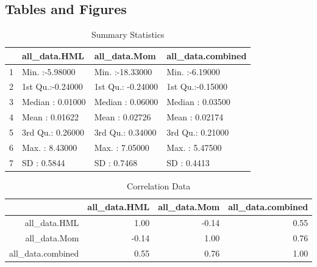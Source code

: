 \documentclass[12pt,letterpaper]{memoir}
\begin{document}
\subsection*{Tables and Figures}
\begin{table}[ht]
\centering
\caption{Summary Statistics}
\begin{tabular}{rlll}
  \hline
 &  all\_data.HML &  all\_data.Mom & all\_data.combined \\ 
  \hline
1 & Min.   :-5.98000   & Min.   :-18.33000   & Min.   :-6.19000   \\ 
  2 & 1st Qu.:-0.24000   & 1st Qu.: -0.24000   & 1st Qu.:-0.15000   \\ 
  3 & Median : 0.01000   & Median :  0.06000   & Median : 0.03500   \\ 
  4 & Mean   : 0.01622   & Mean   :  0.02726   & Mean   : 0.02174   \\ 
  5 & 3rd Qu.: 0.26000   & 3rd Qu.:  0.34000   & 3rd Qu.: 0.21000   \\ 
  6 & Max.   : 8.43000   & Max.   :  7.05000   & Max.   : 5.47500   \\
  7 & SD     : 0.5844    & SD     :  0.7468    & SD     : 0.4413     \\
   \hline
\end{tabular}
\end{table}

\begin{table}[ht]
\centering
\caption{Correlation Data}
\begin{tabular}{rrrr}
  \hline
 & all\_data.HML & all\_data.Mom & all\_data.combined \\ 
  \hline
all\_data.HML & 1.00 & -0.14 & 0.55 \\ 
  all\_data.Mom & -0.14 & 1.00 & 0.76 \\ 
  all\_data.combined & 0.55 & 0.76 & 1.00 \\ 
   \hline
\end{tabular}
\end{table}
\end{document}
